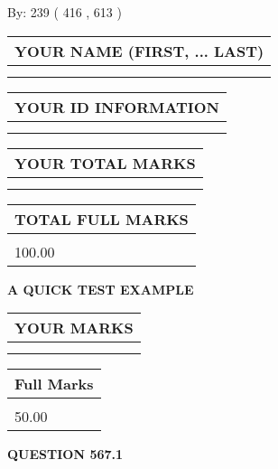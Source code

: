 \documentclass[12pt]{article}
\begin{document}
   
\hspace{1.0in} By: 
 239 ( 416 ,  613 )
   
   
   
   
\newpage 
\setcounter{page}{ 
   567001 } 
   
   
   
   
\noindent\begin{tabular}{|l|}
\hline
YOUR NAME (FIRST, ... LAST)  \\
\hline
 \\ 
 \\ 
\hline
\end{tabular}
\hspace{0.05in} \begin{tabular}{|l|}
\hline
 YOUR   ID   INFORMATION  \\
\hline
 \\ 
 \\ 
\hline
\end{tabular}
   
   
\vspace{0.2in}\noindent\begin{tabular}{|l|}
\hline
YOUR TOTAL MARKS  \\
\hline
 \\ 
 \\ 
\hline
\end{tabular}
\hspace{0.05in} \begin{tabular}{|l|}
\hline
TOTAL FULL MARKS  \\
\hline
 \\ 
100.00 \\
\hline
\end{tabular}
   
   
 \vspace{0.2in}
{\LARGE {\textbf{ A QUICK TEST EXAMPLE}}}
   
   
  
\vspace{0.2in}
  
\noindent\begin{tabular}{|l|}
\hline
 YOUR MARKS  \\
\hline
 \\ 
 \\ 
\hline
\end{tabular}
\hspace{0.05in} \begin{tabular}{|l|}
\hline
 Full Marks  \\
\hline
 \\ 
50.00 \\
\hline
\end{tabular}
{\textbf{\Large{QUESTION
567.1 
}}}
  
\end{document}
